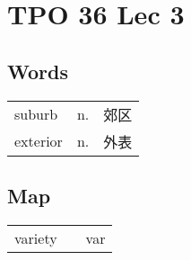 \section{TPO 36 Lec 3}

\subsection{Words}

\begin{tabular}{lll}
    suburb   & n. & 郊区 \\
    exterior & n. & 外表 \\
\end{tabular}


\subsection{Map}

\begin{tabular}{rc@{\quad$\to$\quad}l}
    variety &  & var \\
\end{tabular}